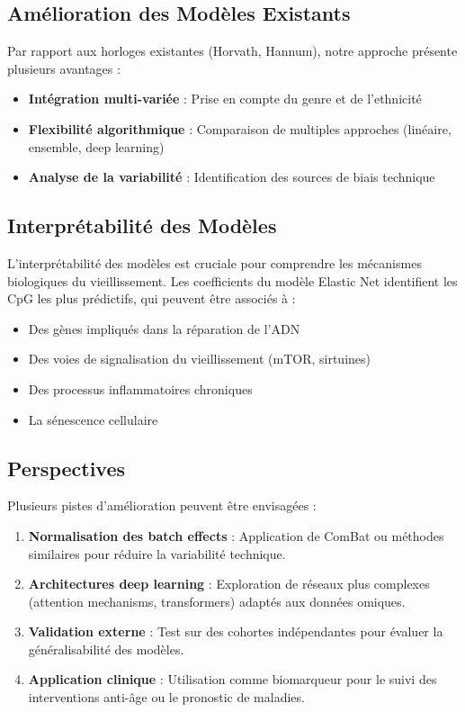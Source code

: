 \documentclass[11pt,a4paper]{article}
\begin{document}
\subsection{Amélioration des Modèles Existants}

Par rapport aux horloges existantes (Horvath, Hannum), notre approche présente 
plusieurs avantages :

\begin{itemize}
    \item \textbf{Intégration multi-variée} : Prise en compte du genre et de l'ethnicité
    \item \textbf{Flexibilité algorithmique} : Comparaison de multiples approches 
          (linéaire, ensemble, deep learning)
    \item \textbf{Analyse de la variabilité} : Identification des sources de biais technique
\end{itemize}

\subsection{Interprétabilité des Modèles}

L'interprétabilité des modèles est cruciale pour comprendre les mécanismes biologiques 
du vieillissement. Les coefficients du modèle Elastic Net identifient les CpG les plus 
prédictifs, qui peuvent être associés à :

\begin{itemize}
    \item Des gènes impliqués dans la réparation de l'ADN
    \item Des voies de signalisation du vieillissement (mTOR, sirtuines)
    \item Des processus inflammatoires chroniques
    \item La sénescence cellulaire
\end{itemize}

\subsection{Perspectives}

Plusieurs pistes d'amélioration peuvent être envisagées :

\begin{enumerate}
    \item \textbf{Normalisation des batch effects} : Application de ComBat ou méthodes 
          similaires pour réduire la variabilité technique.
    
    \item \textbf{Architectures deep learning} : Exploration de réseaux plus complexes 
          (attention mechanisms, transformers) adaptés aux données omiques.
    
    \item \textbf{Validation externe} : Test sur des cohortes indépendantes pour 
          évaluer la généralisabilité des modèles.
    
    \item \textbf{Application clinique} : Utilisation comme biomarqueur pour le 
          suivi des interventions anti-âge ou le pronostic de maladies.
\end{enumerate}
\end{document}
